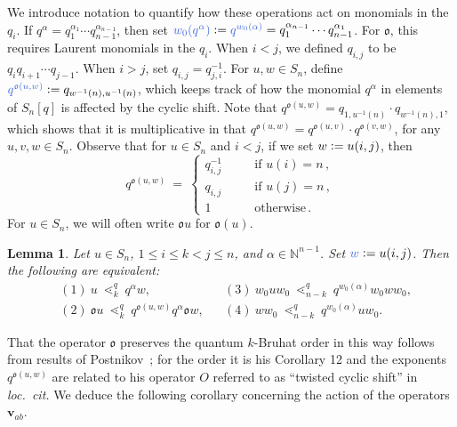 \documentclass[12pt,oneside,reqno]{amsart}
\newtheorem{lemma}[theorem]{Lemma}
\theoremstyle{definition}
\numberwithin{equation}{section}
\newcommand{\NN}{{\mathbb N}}
\newcommand{\qv}{{\mathbf v}}
\newcommand{\defcolor}[1]{{\color{RoyalBlue}#1}}
\newcommand{\ncycle}{\mathfrak o}
\begin{document}
We introduce notation to quantify how these operations act on monomials in the $q_i$.
If $q^\alpha=q_1^{\alpha_1}\dotsb q_{n-1}^{\alpha_{n-1}}$, then set
$\defcolor{w_0(q^\alpha)}\vcentcolon=\defcolor{q^{w_0(\alpha)}}=q_1^{\alpha_{n-1}}\dotsb q_{n-1}^{\alpha_{1}}$.
For $\ncycle$, this requires Laurent monomials in the $q_i$.
When $i<j$, we defined $q_{i,j}$ to be $q_iq_{i+1}\dotsb q_{j-1}$.
When $i>j$, set $q_{i,j}=q_{j,i}^{-1}$.
For $u,w\in S_n$, define $\defcolor{q^{\ncycle(u,w)}}\vcentcolon=q_{w^{-1}(n),u^{-1}(n)}$, which keeps track of how the monomial $q^\alpha$
in elements of $S_n[q]$ is affected by the cyclic shift.
Note that $q^{\ncycle(u,w)}=q_{1,u^{-1}(n)}\cdot q_{w^{-1}(n),1}$, which shows that it is multiplicative in that
$q^{\ncycle(u,w)}=q^{\ncycle(u,v)}\cdot q^{\ncycle(v,w)}$, for any $u,v,w\in S_n$.
Observe that for $u\in S_n$ and $i<j$, if we set $w\vcentcolon= u(i,j)$, then 
%
\begin{equation}\label{Eq:qOcycle}
   q^{\ncycle(u,w)}\ =\ \left\{ \begin{array}{rcl} 
      q_{i,j}^{-1} &\quad&\mbox{if } u(i)=n\,,\\
      q_{i,j} &\quad&\mbox{if } u(j)=n\,,\\
      1 &\quad&\mbox{otherwise}\,. \end{array}\right.
\end{equation}
%
For $u\in S_n$, we will often write $\ncycle u$ for $\ncycle(u)$.


\begin{lemma}\label{L:symmetry_qkBO}
  Let $u\in S_n$, $1\leq i\leq k<j\leq n$, and $\alpha\in\NN^{n-1}$.
  Set $\defcolor{w}\vcentcolon= u(i,j)$.
  Then the following are equivalent:
  \begin{align*}
    & (1)\ u\ \lessdot_k^q\ q^\alpha w, 
    & &(3)\ w_0uw_0\ \lessdot_{n-k}^q\ q^{w_0(\alpha)} w_0 w w_0, \\
    & (2)\ \ncycle u\ \lessdot_k^q\ q^{\ncycle(u,w)} q^\alpha \ncycle w, 
    & &(4)\ w w_0\ \lessdot_{n-k}^q\ q^{w_0(\alpha)} u w_0.
 \end{align*}
\end{lemma}

That the operator $\ncycle$ preserves the quantum $k$-Bruhat order in this way follows from results of Postnikov~\cite{Postnikov_symmetry};
for the order it is his Corollary 12 and the exponents  $q^{\ncycle(u,w)}$ are related to his operator $O$ referred to as ``twisted cyclic
shift'' in {\it loc.\ cit.}
We deduce the following corollary concerning the action of the operators $\qv_{ab}$.
\end{document}
